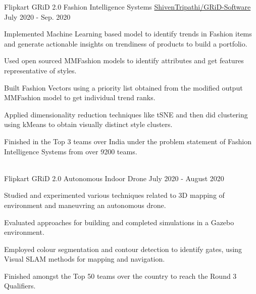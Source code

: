 
\begin{cventries}

 \cventry
    {Flipkart GRiD 2.0}
    {Fashion Intelligence Systems}
    {\selectfont \href{https://github.com/ShivenTripathi/GRiD-Software}{ShivenTripathi/GRiD-Software}}
    {July 2020 - Sep. 2020}
    {
      Implemented Machine Learning based model to identify trends in Fashion items and generate actionable insights on trendiness of products to build a portfolio.
      \begin{cvitems}
        
        \item {Used open sourced MMFashion models to identify attributes and get features representative of styles.}
        \item {Built Fashion Vectors using a priority list obtained from the modified output MMFashion model to get individual trend ranks.}
        \item {Applied dimensionality reduction techniques like tSNE and then did clustering using kMeans to obtain visually distinct style clusters.}
      
      \end{cvitems}
      Finished in the Top 3 teams over India under the problem statement of Fashion Intelligence Systems from over 9200 teams.
    }\\
   \cventry
    {Flipkart GRiD 2.0}
    {Autonomous Indoor Drone}
    {}
    {July 2020 - August 2020}
    {
      \begin{cvitems}
        \item {Studied and experimented various techniques related to 3D mapping of environment and maneuvring an autonomous drone.}
        \item {Evaluated approaches for building and completed simulations in a Gazebo environment.}
        \item {Employed colour segmentation and contour detection to identify gates, using Visual SLAM methods for mapping and navigation.}
      \end{cvitems}
      Finished amongst the Top 50 teams over the country to reach the Round 3 Qualifiers.
    }\\


\end{cventries}

